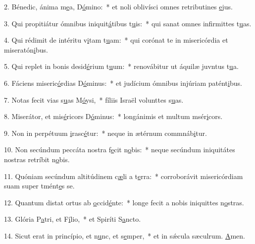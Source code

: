 2. Bénedic, ánima m\uline{e}a, D\uline{ó}mino:~* et noli oblivísci omnes retributines \uline{e}jus.\par 
3. Qui propitiátur ómnibus iniquit\uline{á}tibus t\uline{u}is:~* qui sanat omnes infirmittes t\uline{u}as.\par 
4. Qui rédimit de intéritu v\uline{i}tam t\uline{u}am:~* qui corónat te in misericórdia et miseratón\uline{i}bus.\par 
5. Qui replet in bonis desid\uline{é}rium t\uline{u}um:~* renovábitur ut áquilæ juvntus t\uline{u}a.\par 
6. Fáciens miseric\uline{ó}rdias D\uline{ó}minus:~* et judícium ómnibus injúriam patént\uline{i}bus.\par 
7. Notas fecit vias s\uline{u}as M\uline{ó}ysi,~* fíliis Israël volunttes s\uline{u}as.\par 
8. Miserátor, et mis\uline{é}ricors D\uline{ó}minus:~* longánimis et multum msér\uline{i}cors.\par 
9. Non in perpétuum \uline{i}rasc\uline{é}tur:~* neque in ætérnum commnáb\uline{i}tur.\par 
10. Non secúndum peccáta nostra f\uline{e}cit n\uline{o}bis:~* neque secúndum iniquitátes nostras retríbit n\uline{o}bis.\par 
11. Quóniam secúndum altitúdinem c\uline{æ}li a t\uline{e}rra:~* corroborávit misericórdiam suam super tmént\uline{e}s se.\par 
12. Quantum distat ortus ab \uline{o}ccid\uline{é}nte:~* longe fecit a nobis iniquittes n\uline{o}stras.\par 
13. Glória P\uline{a}tri, et F\uline{í}lio,~* et Spiríti S\uline{a}ncto.\par 
14. Sicut erat in princípio, et n\uline{u}nc, et s\uline{e}mper,~* et in sǽcula sæculrum. \uline{A}men.\par 
